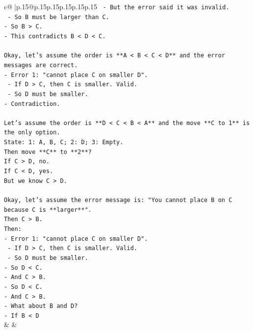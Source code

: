 \documentclass{article}
\begin{document}
{\begin{supertabular}{c@{$\;$}|p{.15\linewidth}@{}p{.15\linewidth}p{.15\linewidth}p{.15\linewidth}p{.15\linewidth}p{.15\linewidth}}
{{{\texttt{    {-} But the error said it was invalid.} \\
\texttt{    {-} So B must be larger than C.} \\
\texttt{{-} So B > C.} \\
\texttt{{-} This contradicts B < D < C.} \\
\\ 
\texttt{Okay, let's assume the order is **A < B < C < D** and the error messages are correct.} \\
\texttt{{-} Error 1: "cannot place C on smaller D".} \\
\texttt{    {-} If D > C, then C is smaller. Valid.} \\
\texttt{    {-} So D must be smaller.} \\
\texttt{{-} Contradiction.} \\
\\ 
\texttt{Let's assume the order is **D < C < B < A** and the move **C to 1** is the only option.} \\
\texttt{State: 1: A, B, C; 2: D; 3: Empty.} \\
\texttt{Then move **C** to **2**?} \\
\texttt{If C > D, no.} \\
\texttt{If C < D, yes.} \\
\texttt{But we know C > D.} \\
\\ 
\texttt{Okay, let's assume the error message is: "You cannot place B on C because C is **larger**".} \\
\texttt{Then C > B.} \\
\texttt{Then:} \\
\texttt{{-} Error 1: "cannot place C on smaller D".} \\
\texttt{    {-} If D > C, then C is smaller. Valid.} \\
\texttt{    {-} So D must be smaller.} \\
\texttt{{-} So D < C.} \\
\texttt{{-} And C > B.} \\
\texttt{{-} So D < C.} \\
\texttt{{-} And C > B.} \\
\texttt{{-} What about B and D?} \\
\texttt{{-} If B < D} \\
            }
        }
    }
    & & \\ \\


\end{supertabular}}
\end{document}
